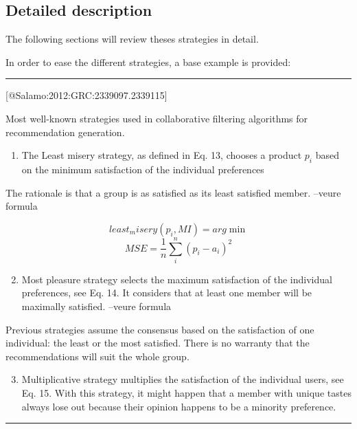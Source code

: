 \documentclass[]{article}
\begin{document}
\subsection{Detailed description}

The following sections will review theses strategies in detail.

In order to ease the different strategies, a base example is provided:

\begin{center}\rule{3in}{0.4pt}\end{center}

{[}@Salamo:2012:GRC:2339097.2339115{]}

Most well-known strategies used in collaborative filtering algorithms
for recommendation generation.

\begin{enumerate}[1.]
\item
  The Least misery strategy, as defined in Eq. 13, chooses a product
  $p_i$ based on the minimum satisfaction of the individual preferences
\end{enumerate}

The rationale is that a group is as satisfied as its least satisfied
member. --veure formula

\[least_misery(p_i,MI) = arg \min{}\]
\[MSE = \frac{1}{n}\sum_{i}^{n} (p_i - a_i)^2 \]

\begin{enumerate}[1.]
\setcounter{enumi}{1}
\item
  Most pleasure strategy selects the maximum satisfaction of the
  individual preferences, see Eq. 14. It considers that at least one
  member will be maximally satisfied. --veure formula
\end{enumerate}

Previous strategies assume the consensus based on the satisfaction of
one individual: the least or the most satisfied. There is no warranty
that the recommendations will suit the whole group.

\begin{enumerate}[1.]
\setcounter{enumi}{2}
\item
  Multiplicative strategy multiplies the satisfaction of the individual
  users, see Eq. 15. With this strategy, it might happen that a member
  with unique tastes always lose out because their opinion happens to be
  a minority preference.
\end{enumerate}

\begin{center}\rule{3in}{0.4pt}\end{center}
\end{document}
